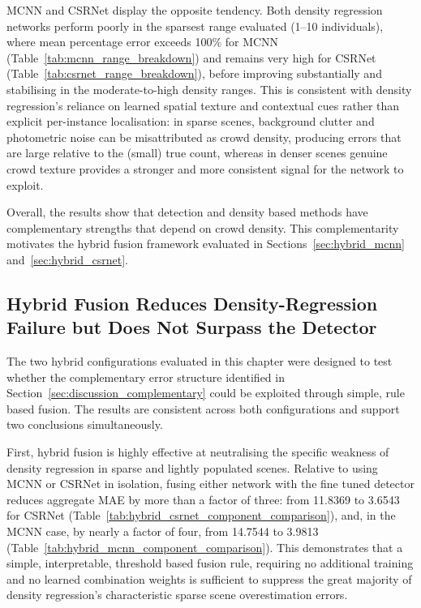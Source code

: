 MCNN and CSRNet display the opposite tendency. Both density regression networks perform poorly in the sparsest range evaluated (1--10 individuals), where mean percentage error exceeds 100\% for MCNN (Table~\ref{tab:mcnn_range_breakdown}) and remains very high for CSRNet (Table~\ref{tab:csrnet_range_breakdown}), before improving substantially and stabilising in the moderate-to-high density ranges. This is consistent with density regression's reliance on learned spatial texture and contextual cues rather than explicit per-instance localisation: in sparse scenes, background clutter and photometric noise can be misattributed as crowd density, producing errors that are large relative to the (small) true count, whereas in denser scenes genuine crowd texture provides a stronger and more consistent signal for the network to exploit.

Overall, the results show that detection and density based methods have complementary strengths that depend on crowd density. This complementarity motivates the hybrid fusion framework evaluated in Sections~\ref{sec:hybrid_mcnn} and~\ref{sec:hybrid_csrnet}.

\subsection{Hybrid Fusion Reduces Density-Regression Failure but Does Not Surpass the Detector}
\label{sec:discussion_hybrid}

The two hybrid configurations evaluated in this chapter were designed to test whether the complementary error structure identified in Section~\ref{sec:discussion_complementary} could be exploited through simple, rule based fusion. The results are consistent across both configurations and support two conclusions simultaneously.

First, hybrid fusion is highly effective at neutralising the specific weakness of density regression in sparse and lightly populated scenes. Relative to using MCNN or CSRNet in isolation, fusing either network with the fine tuned detector reduces aggregate MAE by more than a factor of three: from 11.8369 to 3.6543 for CSRNet (Table~\ref{tab:hybrid_csrnet_component_comparison}), and, in the MCNN case, by nearly a factor of four, from 14.7544 to 3.9813 (Table~\ref{tab:hybrid_mcnn_component_comparison}). This demonstrates that a simple, interpretable, threshold based fusion rule, requiring no additional training and no learned combination weights is sufficient to suppress the great majority of density regression's characteristic sparse scene overestimation errors.

